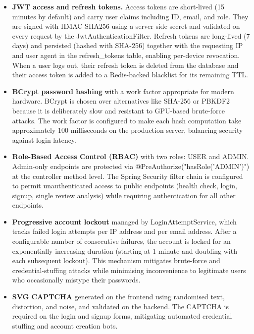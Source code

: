 \documentclass[12pt,a4paper,oneside]{report}
\renewcommand{\texttt}[1]{%
  {\ttfamily\hyphenchar\font=45\relax #1}}
\begin{document}
\begin{itemize}[leftmargin=*]
  \item \textbf{JWT access and refresh tokens.} Access tokens are
        short-lived (15 minutes by default) and carry user claims
        including ID, email, and role. They are signed with HMAC-SHA256
        using a server-side secret and validated on every request by the
        \texttt{JwtAuthenticationFilter}. Refresh tokens are long-lived
        (7 days) and persisted (hashed with SHA-256) together with the
        requesting IP and user agent in the \texttt{refresh\_tokens}
        table, enabling per-device revocation. When a user logs out,
        their refresh token is deleted from the database and their access
        token is added to a Redis-backed blacklist for its remaining TTL.

  \item \textbf{BCrypt password hashing} with a work factor appropriate
        for modern hardware. BCrypt is chosen over alternatives like
        SHA-256 or PBKDF2 because it is deliberately slow and resistant
        to GPU-based brute-force attacks. The work factor is configured
        to make each hash computation take approximately 100 milliseconds
        on the production server, balancing security against login latency.

  \item \textbf{Role-Based Access Control (RBAC)} with two roles:
        \texttt{USER} and \texttt{ADMIN}. Admin-only endpoints are
        protected via \texttt{@PreAuthorize("hasRole('ADMIN')")} at the
        controller method level. The Spring Security filter chain is
        configured to permit unauthenticated access to public endpoints
        (health check, login, signup, single review analysis) while
        requiring authentication for all other endpoints.

  \item \textbf{Progressive account lockout} managed by
        \texttt{LoginAttemptService}, which tracks failed login attempts
        per IP address and per email address. After a configurable number
        of consecutive failures, the account is locked for an
        exponentially increasing duration (starting at 1 minute and
        doubling with each subsequent lockout). This mechanism mitigates
        brute-force and credential-stuffing attacks while minimising
        inconvenience to legitimate users who occasionally mistype their
        passwords.

  \item \textbf{SVG CAPTCHA} generated on the frontend using randomised
        text, distortion, and noise, and validated on the backend. The
        CAPTCHA is required on the login and signup forms, mitigating
        automated credential stuffing and account creation bots.


\end{itemize}
\end{document}
